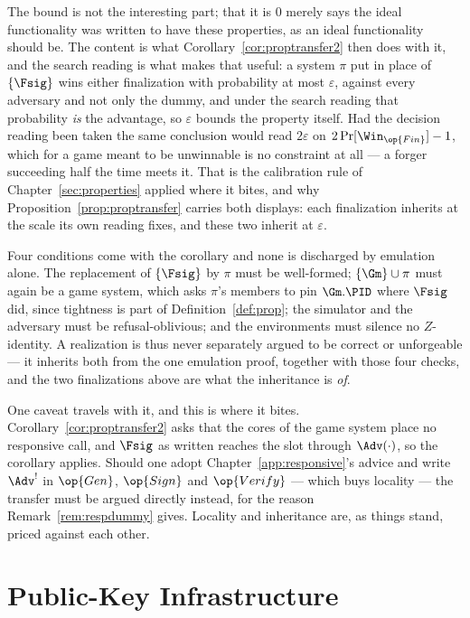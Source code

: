 \documentclass[10pt,oneside,openany]{book}
\theoremstyle{accentdef}
\theoremstyle{accentplain}
\begin{document}
The bound is not the interesting part; that it is $0$ merely says the ideal functionality was written
to have these properties, as an ideal functionality should be. The content is what
Corollary~\ref{cor:proptransfer2} then does with it, and the search reading is what makes that
useful: a system $\pi$ put in place of $\{\Fsig\}$ wins either finalization with probability at most
$\varepsilon$, against every adversary and not only the dummy, and under the search reading that
probability \emph{is} the advantage, so $\varepsilon$ bounds the property itself. Had the decision
reading been taken the same conclusion would read $2\varepsilon$ on $2\Pr[\Win_{\op{Fin}}]-1$, which
for a game meant to be unwinnable is no constraint at all --- a forger
succeeding half the time meets it. That is the calibration rule of Chapter~\ref{sec:properties}
applied where it bites, and why Proposition~\ref{prop:proptransfer} carries both displays: each
finalization inherits at the scale its own reading fixes, and these two inherit at $\varepsilon$.

Four conditions come with the corollary and none is discharged by emulation alone. The replacement of
$\{\Fsig\}$ by $\pi$ must be well-formed; $\{\Gm\} \cup \pi$ must again be a game system, which asks
$\pi$'s members to pin $\Gm.\PID$ where $\Fsig$ did, since tightness is part of
Definition~\ref{def:prop}; the simulator and the adversary must be refusal-oblivious; and the
environments must silence no $Z$-identity. A realization is thus never separately argued to be correct
or unforgeable --- it inherits both from the one emulation proof, together with those four checks, and
the two finalizations above are what the inheritance is \emph{of}.

One caveat travels with it, and this is where it bites. Corollary~\ref{cor:proptransfer2} asks that
the cores of the game system place no responsive call, and $\Fsig$ as written reaches the slot through
$\Adv(\cdot)$, so the corollary applies. Should one adopt Chapter~\ref{app:responsive}'s advice and
write $\Adv^{!}$ in $\op{Gen}$, $\op{Sign}$ and $\op{Verify}$ --- which buys locality --- the transfer
must be argued directly instead, for the reason Remark~\ref{rem:respdummy} gives. Locality and
inheritance are, as things stand, priced against each other.

\chapter{Public-Key Infrastructure}\label{sec:pki}
\end{document}
